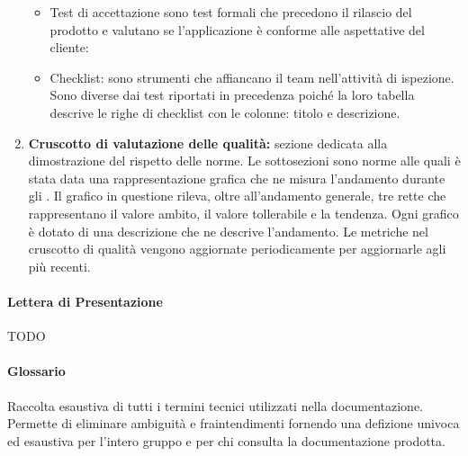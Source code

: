 \begin{enumerate}
\begin{itemize}
    \item Test di accettazione sono test formali che precedono il rilascio del prodotto e valutano se l’applicazione è conforme alle aspettative del cliente:
    \item Checklist: sono strumenti che affiancano il team nell'attività di ispezione. Sono diverse dai test riportati in precedenza poiché la loro tabella descrive le righe di checklist con le colonne: titolo e descrizione.
  \end{itemize}
  \item \textbf{Cruscotto di valutazione delle qualità:} sezione dedicata alla dimostrazione del rispetto delle norme. Le sottosezioni sono norme alle quali è stata data una rappresentazione grafica che ne misura l'andamento durante gli . Il grafico in questione rileva, oltre all'andamento generale, tre rette che rappresentano il valore ambito, il valore tollerabile e la tendenza. Ogni grafico è dotato di una descrizione che ne descrive l'andamento. Le metriche nel cruscotto di qualità vengono aggiornate periodicamente per aggiornarle agli  più recenti.
\end{enumerate}

\paragraph{Lettera di Presentazione}
TODO

\paragraph{Glossario}
Raccolta esaustiva di tutti i termini tecnici utilizzati nella documentazione. Permette di eliminare ambiguità e fraintendimenti fornendo una defizione univoca ed esaustiva per l'intero gruppo e per chi consulta la documentazione prodotta.

